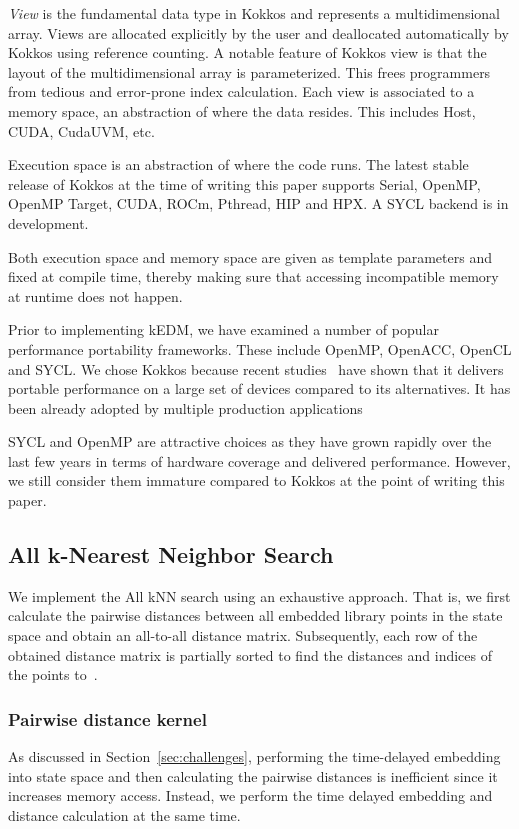\documentclass[conference]{IEEEtran}
\begin{document}
\textit{View} is the fundamental data type in Kokkos and represents a
multidimensional array. Views are allocated explicitly by the user and
deallocated automatically by Kokkos using reference counting. A notable
feature of Kokkos view is that the layout of the multidimensional array is
parameterized. This frees programmers from tedious and error-prone index
calculation. Each view is associated to a memory space, an abstraction of
where the data resides. This includes Host, CUDA, CudaUVM, etc.

Execution space is an abstraction of where the code runs. The latest stable
release of Kokkos at the time of writing this paper supports Serial, OpenMP,
OpenMP Target, CUDA, ROCm, Pthread, HIP and HPX\@. A SYCL backend is in
development.

Both execution space and memory space are given as template parameters and
fixed at compile time, thereby making sure that accessing incompatible memory
at runtime does not happen.

Prior to implementing kEDM, we have examined a number of popular performance
portability frameworks. These include OpenMP, OpenACC, OpenCL and SYCL\@. We
chose Kokkos  because recent studies~\cite{Martineau2017, Deakin2019, Deakin2020}
have shown that it delivers portable performance on a large set of devices
compared to its alternatives. It has been already adopted by multiple
production applications~\cite{Sprague2020,Holmen2017,Demeshko2019}

SYCL and OpenMP are attractive choices as they
have grown rapidly over the last few years in terms of hardware coverage and
delivered performance. However, we still consider them immature compared to
Kokkos at the point of writing this paper.

\subsection{All k-Nearest Neighbor Search}

We implement the All kNN search using an exhaustive approach. That is, we
first calculate the pairwise distances between all embedded library points in
the state space and obtain an all-to-all distance matrix. Subsequently, each
row of the obtained distance matrix is partially sorted to find the distances
and indices of the points
to~\cite{Garcia2008,Garcia2010}.

\cite{Johnson2019}
\cite{Shanbhag2018}

\subsubsection{Pairwise distance kernel}
As discussed in Section~\ref{sec:challenges}, performing the time-delayed
embedding into state space and then calculating the pairwise distances is
inefficient since it increases memory access. Instead, we perform the time
delayed embedding and distance calculation at the same time.
\end{document}

